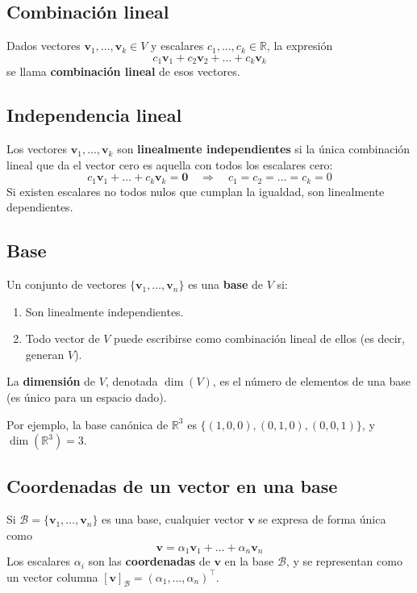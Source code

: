 \documentclass[12pt,a4paper,openany,oneside]{book}
\begin{document}
\subsection{Combinación lineal}
Dados vectores $\mathbf{v}_1, \dots, \mathbf{v}_k \in V$ y escalares $c_1, \dots, c_k \in \mathbb{R}$, la expresión
\[
c_1 \mathbf{v}_1 + c_2 \mathbf{v}_2 + \dots + c_k \mathbf{v}_k
\]
se llama \textbf{combinación lineal} de esos vectores.

\subsection{Independencia lineal}
Los vectores $\mathbf{v}_1, \dots, \mathbf{v}_k$ son \textbf{linealmente independientes} si la única combinación lineal que da el vector cero es aquella con todos los escalares cero:
\[
c_1 \mathbf{v}_1 + \dots + c_k \mathbf{v}_k = \mathbf{0} \quad \Rightarrow \quad c_1 = c_2 = \dots = c_k = 0
\]
Si existen escalares no todos nulos que cumplan la igualdad, son linealmente dependientes.

\subsection{Base}
Un conjunto de vectores $\{\mathbf{v}_1, \dots, \mathbf{v}_n\}$ es una \textbf{base} de $V$ si:
\begin{enumerate}
    \item Son linealmente independientes.
    \item Todo vector de $V$ puede escribirse como combinación lineal de ellos (es decir, generan $V$).
\end{enumerate}
La \textbf{dimensión} de $V$, denotada $\dim(V)$, es el número de elementos de una base (es único para un espacio dado).

Por ejemplo, la base canónica de $\mathbb{R}^3$ es $\{(1,0,0), (0,1,0), (0,0,1)\}$, y $\dim(\mathbb{R}^3)=3$.

\subsection{Coordenadas de un vector en una base}
Si $\mathcal{B} = \{\mathbf{v}_1, \dots, \mathbf{v}_n\}$ es una base, cualquier vector $\mathbf{v}$ se expresa de forma única como
\[
\mathbf{v} = \alpha_1 \mathbf{v}_1 + \dots + \alpha_n \mathbf{v}_n
\]
Los escalares $\alpha_i$ son las \textbf{coordenadas} de $\mathbf{v}$ en la base $\mathcal{B}$, y se representan como un vector columna $[\mathbf{v}]_{\mathcal{B}} = (\alpha_1, \dots, \alpha_n)^\top$.
\end{document}
